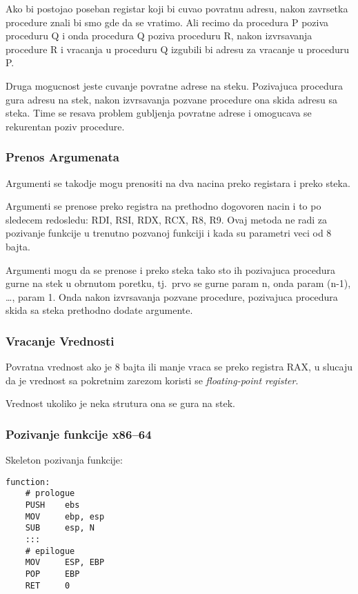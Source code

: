 \documentclass[12p,a4paper]{article}
\begin{document}
\begin{multicols}{2}
    Ako bi postojao poseban registar koji bi cuvao povratnu adresu, nakon
    zavrsetka procedure znali bi smo gde da se vratimo. Ali recimo da 
    procedura P poziva proceduru Q i onda procedura Q poziva proceduru R, nakon
    izvrsavanja procedure R i vracanja u proceduru Q izgubili bi adresu za 
    vracanje u proceduru P.

    Druga mogucnost jeste cuvanje povratne adrese na steku. Pozivajuca 
    procedura gura adresu na stek, nakon izvrsavanja pozvane procedure ona
    skida adresu sa steka. Time se resava problem gubljenja povratne adrese
    i omogucava se rekurentan poziv procedure.
    
    \subsubsection{Prenos Argumenata}

    Argumenti se takodje mogu prenositi na dva nacina preko registara i preko
    steka.

    Argumenti se prenose preko registra na prethodno dogovoren nacin i to
    po sledecem redosledu: RDI, RSI, RDX, RCX, R8, R9. Ovaj metoda ne radi
    za pozivanje funkcije u trenutno pozvanoj funkciji i kada su parametri
    veci od 8 bajta.

    Argumenti mogu da se prenose i preko steka tako sto ih pozivajuca 
    procedura gurne na stek u obrnutom poretku, tj.\ prvo se gurne param n, 
    onda param (n-1), \ldots,
    param 1. Onda nakon izvrsavanja pozvane procedure, pozivajuca procedura
    skida sa steka prethodno dodate argumente.

    \subsubsection{Vracanje Vrednosti}

    Povratna vrednost ako je 8 bajta ili manje vraca se preko registra RAX,
    u slucaju da je vrednost sa pokretnim zarezom koristi se 
    \emph{floating-point register}.

    Vrednost ukoliko je neka strutura ona se gura na stek.
    
    \subsubsection{Pozivanje funkcije x86--64}

    Skeleton pozivanja funkcije:
    \begin{lstlisting}
function:
    # prologue
    PUSH    ebs         
    MOV     ebp, esp
    SUB     esp, N
    :::
    # epilogue
    MOV     ESP, EBP
    POP     EBP
    RET     0


\end{lstlisting}
\end{multicols}
\end{document}
